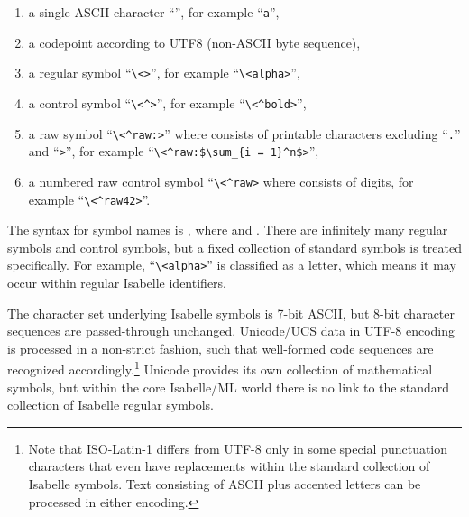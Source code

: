 \begin{isabellebody}
\begin{isamarkuptext}
\begin{enumerate}
  \item a single ASCII character ``'', for example
  ``\verb,a,'',

  \item a codepoint according to UTF8 (non-ASCII byte sequence),

  \item a regular symbol ``\verb,\,\verb,<,\verb,>,'',
  for example ``\verb,\,\verb,<alpha>,'',

  \item a control symbol ``\verb,\,\verb,<^,\verb,>,'',
  for example ``\verb,\,\verb,<^bold>,'',

  \item a raw symbol ``\verb,\,\verb,<^raw:,\verb,>,''
  where  consists of printable characters excluding
  ``\verb,.,'' and ``\verb,>,'', for example
  ``\verb,\,\verb,<^raw:$\sum_{i = 1}^n$>,'',

  \item a numbered raw control symbol ``\verb,\,\verb,<^raw,\verb,>, where  consists of digits, for example
  ``\verb,\,\verb,<^raw42>,''.

  \end{enumerate}

  The  syntax for symbol names is , where  and .  There are infinitely many regular symbols and
  control symbols, but a fixed collection of standard symbols is
  treated specifically.  For example, ``\verb,\,\verb,<alpha>,'' is
  classified as a letter, which means it may occur within regular
  Isabelle identifiers.

  The character set underlying Isabelle symbols is 7-bit ASCII, but
  8-bit character sequences are passed-through unchanged.  Unicode/UCS
  data in UTF-8 encoding is processed in a non-strict fashion, such
  that well-formed code sequences are recognized
  accordingly.\footnote{Note that ISO-Latin-1 differs from UTF-8 only
  in some special punctuation characters that even have replacements
  within the standard collection of Isabelle symbols.  Text consisting
  of ASCII plus accented letters can be processed in either encoding.}
  Unicode provides its own collection of mathematical symbols, but
  within the core Isabelle/ML world there is no link to the standard
  collection of Isabelle regular symbols.


\end{isamarkuptext}
\end{isabellebody}
